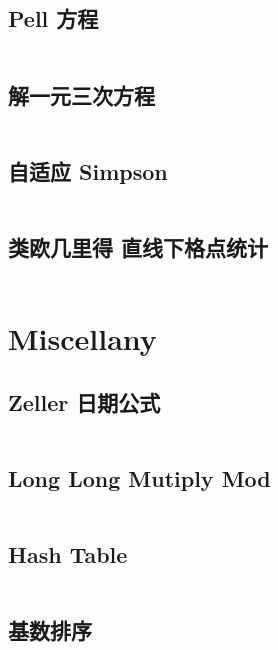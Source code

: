 \documentclass[titlepage, a4paper]{article}
\begin{document}
\begin{multicols}{2}
\begin{spacing}{0.6}
				\subsection{Pell 方程}
				\inputminted{cpp}{src/Math/Pell方程.cpp}
				\subsection{解一元三次方程}
				\inputminted{cpp}{src/Math/解一元三次方程.cpp}
				\subsection{自适应 Simpson}
				\inputminted{cpp}{src/Math/Simpson.cpp}
				\subsection{类欧几里得 直线下格点统计}
				\inputminted{cpp}{src/Math/直线下格点统计.cpp}
			
			\section{Miscellany}
				\subsection{Zeller 日期公式}
				\inputminted{cpp}{src/Miscellany/日期公式.cpp}
				\subsection{Long Long Mutiply Mod}
				\inputminted{cpp}{src/Miscellany/LLFPM.cpp}
				\subsection{Hash Table}
				\inputminted{cpp}{src/DataStructure/hashmap.cpp}
				\subsection{基数排序}
				\inputminted{cpp}{src/Miscellany/RadixSort.cpp}

\end{spacing}
\end{multicols}
\end{document}
